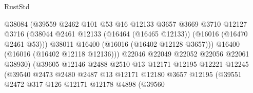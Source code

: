 \begin{lexlean}{RustStd}
\begin{coremodule}
                                        @38084
                                        (@39559
                                          @2462
                                          @101
                                          @53
                                          @16
                                          @12133
                                          @3657
                                          @3669
                                          @3710
                                          @12127
                                          @3716
                                          (@38044
                                            @2461
                                            @12133
                                            (@16464 (@16465 @12133))
                                            (@16016 (@16470 @2461 @53)))
                                          @38011
                                          @16400
                                          (@16016 (@16402 @12128 @3657)))
                                        @16400
                                        (@16016 (@16402 @12118 @12136)))
                                      @22046
                                      @22049
                                      @22052
                                      @22056
                                      @22061
                                      @38930)
                                    (@39605
                                      @12146
                                      @2488
                                      @2510
                                      @13
                                      @12171
                                      @12195
                                      @12221
                                      @12245
                                      (@39540
                                        @2473
                                        @2480
                                        @2487
                                        @13
                                        @12171
                                        @12180
                                        @3657
                                        @12195
                                        (@39551
                                          @2472
                                          @317
                                          @126
                                          @12171
                                          @12178
                                          @4898
                                          (@39560

\end{coremodule}
\end{lexlean}
